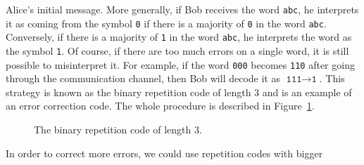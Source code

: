 Alice's initial message. More generally, if Bob receives the word
\texttt{abc}, he
interprets it as coming from the symbol \texttt{0} if there is a majority of
\texttt{0} in the word \texttt{abc}. Conversely, if there is a majority of
\texttt{1} in the word \texttt{abc}, he interprets the word as the symbol
\texttt{1}. Of course, if there are too much errors on a single word, it is
still possible to misinterpret it. For example, if the word
\texttt{000} becomes \texttt{110} after going through the communication channel,
then Bob will decode it as $\texttt{111}\to\texttt{1}$. This strategy is known
as the binary repetition code of
length $3$ and is an example of an error correction code. The whole procedure is
described in Figure~\ref{fig:rep3}.
\begin{figure}[h]
  \centering
  \caption{The binary repetition code of length $3$.}
  \label{fig:rep3}
\end{figure}
In order to correct more errors, we could use repetition codes with bigger
